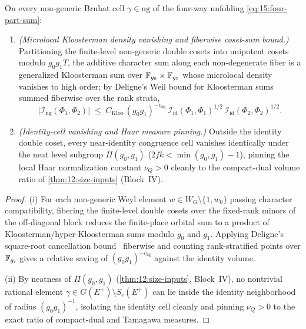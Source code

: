 \begin{proposition}
\label{prop:16:kloosterman}
On every non-generic Bruhat cell $\gamma \in \mathrm{ng}$ of the four-way unfolding \eqref{eq:15:four-part-sum}:
\begin{enumerate}[label=\textup{(\roman*)}]
\item \emph{(Microlocal Kloosterman density vanishing and fiberwise coset-sum bound.)} Partitioning the finite-level non-generic double cosets into unipotent cosets modulo $g_0 g_1 T$, the additive character sum along each non-degenerate fiber is a generalized Kloosterman sum over $\mathbb{F}_{g_0} \times \mathbb{F}_{g_1}$ whose microlocal density vanishes to high order; by Deligne's Weil bound for Kloosterman sums~\cite{Deligne1974} summed fiberwise over the rank strata,
  \[
    \bigl|\mathcal{I}_{\mathrm{ng}}(\Phi_1, \Phi_2)\bigr| \;\le\; C_{\mathrm{Kloo}}\, (g_0 g_1)^{-c_{\mathrm{ng}}}\, \mathcal{I}_{\mathrm{id}}(\Phi_1, \Phi_1)^{1/2}\,\mathcal{I}_{\mathrm{id}}(\Phi_2, \Phi_2)^{1/2}.
  \]
\item \emph{(Identity-cell vanishing and Haar measure pinning.)} Outside the identity double coset, every near-identity congruence cell vanishes identically under the neat level subgroup $\Pi(g_0, g_1)$ ($2fk < \min(g_0, g_1) - 1$), pinning the local Haar normalization constant $\nu_Q > 0$ cleanly to the compact-dual volume ratio of \cref{thm:12:size-inputs} (Block~IV).
\end{enumerate}
\end{proposition}

\begin{proof}
(i) For each non-generic Weyl element $w \in W_G \setminus \{1, w_0\}$ passing character compatibility, fibering the finite-level double cosets over the fixed-rank minors of the off-diagonal block reduces the finite-place orbital sum to a product of Kloosterman/hyper-Kloosterman sums modulo $g_0$ and $g_1$. Applying Deligne's square-root cancellation bound~\cite{Deligne1974} fiberwise and counting rank-stratified points over $\mathbb{F}_{g_i}$ gives a relative saving of $(g_0 g_1)^{-c_{\mathrm{ng}}}$ against the identity volume.

(ii) By neatness of $\Pi(g_0, g_1)$ (\cref{thm:12:size-inputs}, Block~IV), no nontrivial rational element $\gamma \in G(E^+) \setminus S_r(E^+)$ can lie inside the identity neighborhood of radius $(g_0 g_1)^{-1}$, isolating the identity cell cleanly and pinning $\nu_Q > 0$ to the exact ratio of compact-dual and Tamagawa measures.
\end{proof}


